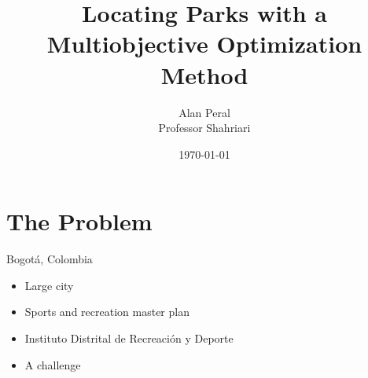 \documentclass[10pt, compress]{beamer}
\title{Locating Parks with a Multiobjective Optimization Method}
\subtitle{}
\date{\today}
\author{Alan Peral \\ Professor Shahriari}
\institute{Pomona College}
\begin{document}
\maketitle
\section{The Problem}



\begin{frame}{Bogot\'{a}, Colombia}
  \begin{itemize}[<+- | alert@+>]
    \item Large city %
    \item Sports and recreation master plan %
    \item Instituto Distrital de Recreaci\'{o}n y Deporte %
    \item A challenge %
   \end{itemize}
\end{frame}


\end{document}

